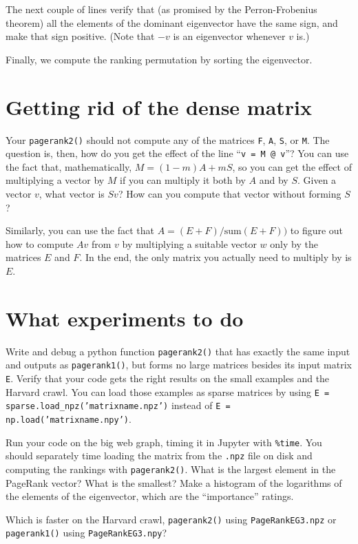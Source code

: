 \documentclass[11pt]{article}
\begin{document}
The next couple of lines verify that (as promised by the
Perron-Frobenius theorem) all the elements of the dominant
eigenvector have the same sign, and make that sign positive. 
(Note that $-v$ is an eigenvector whenever $v$ is.)

Finally, we compute the ranking permutation by sorting the eigenvector.

\section{Getting rid of the dense matrix}

Your {\tt pagerank2()} should not compute any of the
matrices {\tt F}, {\tt A}, {\tt S}, or {\tt M}.
The question is, then, how do you get the effect
of the line ``{\tt v = M @ v}''?
You can use the fact that, mathematically,
$M = (1-m)A + mS$,
so you can get the effect of multiplying a vector by $M$
if you can multiply it both by $A$ and by $S$.
Given a vector $v$, what vector is $Sv$?
How can you compute that vector without forming $S$?

Similarly, you can use the fact that $A = (E+F)/\mbox{sum}(E+F))$
to figure out how to compute $Av$ from $v$ by
multiplying a suitable vector $w$ only by the matrices
$E$ and $F$.
In the end, the only matrix you actually need to
multiply by is $E$.

\section{What experiments to do}

Write and debug a python function {\tt pagerank2()} that has
exactly the same input and outputs as {\tt pagerank1()},
but forms no large matrices besides its input matrix {\tt E}.
Verify that your code gets the right results
on the small examples and the Harvard crawl.
You can load those examples as sparse matrices by using
{\tt E = sparse.load\_npz('matrixname.npz')} instead of
{\tt E = np.load('matrixname.npy')}.

Run your code on the big web graph, timing it in Jupyter
with {\tt \%time}.
You should separately time loading the matrix from the {\tt .npz}
file on disk and computing the rankings with {\tt pagerank2()}.
What is the largest element in the PageRank vector?
What is the smallest?
Make a histogram of the logarithms of the elements of the
eigenvector, which are the ``importance'' ratings.

Which is faster on the Harvard crawl, 
{\tt pagerank2()} using {\tt PageRankEG3.npz} or
{\tt pagerank1()} using {\tt PageRankEG3.npy}?
\end{document}
